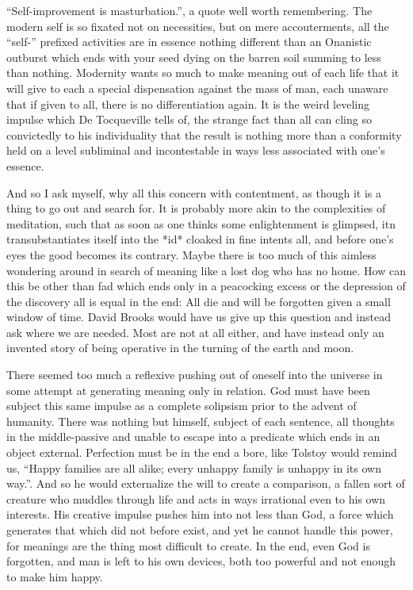 \documentclass[ebook, 10pt, openright, onecolumn]{memoir}
\newcommand*\td[1]{
  \todo[inline]{
     #1 
  }
}
\newcommand*\finish{\td{ ----- Finish this section -----}}
\begin{document}
\finish{}

``Self-improvement is masturbation.'', a quote well worth remembering.  The
modern self is so fixated not on necessities, but on mere accouterments, all the
``self-'' prefixed activities are in essence nothing different than an Onanistic
outburst which ends with your seed dying on the barren soil summing to less than
nothing.  Modernity wants so much to make meaning out of each life that it will
give to each a special dispensation against the mass of man, each unaware that
if given to all, there is no differentiation again.  It is the weird leveling
impulse which De Tocqueville tells of, the strange fact than all can cling so
convictedly to his individuality that the result is nothing more than a
conformity held on a level subliminal and incontestable in ways less associated
with one's essence.

And so I ask myself, why all this concern with contentment, as though it is a
thing to go out and search for.  It is probably more akin to the complexities of
meditation, such that as soon as one thinks some enlightenment is glimpsed, itn
transubstantiates itself into the *id* cloaked in fine intents all, and before
one's eyes the good becomes its contrary.  Maybe there is too much of this
aimless wondering around in search of meaning like a lost dog who has no home.
How can this be other than fad which ends only in a peacocking excess or the
depression of the discovery all is equal in the end: All die and will be
forgotten given a small window of time.  David Brooks would have us give up this
question and instead ask where we are needed.  Most are not at all either, and
have instead only an invented story of being operative in the turning of the
earth and moon. 

\finish{}

There seemed too much a reflexive pushing out of oneself into the universe in
some attempt at generating meaning only in relation.  God must have been subject
this same impulse as a complete solipsism prior to the advent of humanity.  There
was nothing but himself, subject of each sentence, all thoughts in the
middle-passive and unable to escape into a predicate which ends in an object
external.  Perfection must be in the end a bore, like Tolstoy would remind us,
``Happy families are all alike; every unhappy family is unhappy in its own
way.''.  And so he would externalize the will to create a comparison, a fallen
sort of creature who muddles through life and acts in ways irrational even to
his own interests.  His creative impulse pushes him into not less than God, a
force which generates that which did not before exist, and yet he cannot handle
this power, for meanings are the thing most difficult to create.  In the end,
even God is forgotten, and man is left to his own devices, both too powerful and
not enough to make him happy.
\end{document}
